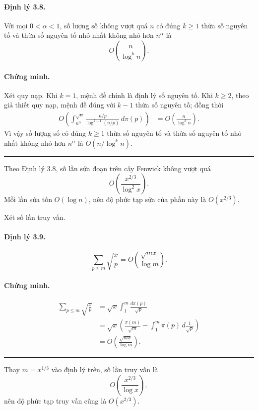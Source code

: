 \documentclass[11pt]{article}
\newcommand{\qedmark}{\hfill\rule{0.7ex}{0.7ex}}
\begin{document}
\paragraph{Định lý 3.8.}
Với mọi \(0<\alpha<1\), số lượng số không vượt quá \(n\) có đúng \(k\ge 1\)
thừa số nguyên tố và thừa số nguyên tố nhỏ nhất không nhỏ hơn \(n^\alpha\) là
\[
  O\left(\frac{n}{\log^k n}\right).
\]

\paragraph{Chứng minh.}
Xét quy nạp. Khi \(k=1\), mệnh đề chính là định lý số nguyên tố. Khi
\(k\ge 2\), theo giả thiết quy nạp, mệnh đề đúng với \(k-1\) thừa số nguyên tố;
đồng thời
\[
\begin{aligned}
O\left(\int_{n^\alpha}^{\sqrt n}
\frac{n/p}{\log^{k-1}(n/p)}\,d\pi(p)\right)
&=O\left(\frac{n}{\log^k n}\right).
\end{aligned}
\]
Vì vậy số lượng số có đúng \(k\ge 1\) thừa số nguyên tố và thừa số nguyên tố
nhỏ nhất không nhỏ hơn \(n^\alpha\) là \(O(n/\log^k n)\). \qedmark

Theo Định lý 3.8, số lần sửa đoạn trên cây Fenwick không vượt quá
\[
  O\left(\frac{x^{2/3}}{\log^2 x}\right).
\]
Mỗi lần sửa tốn \(O(\log n)\), nên độ phức tạp sửa của phần này là
\(O(x^{2/3})\).

Xét số lần truy vấn.

\paragraph{Định lý 3.9.}
\[
  \sum_{p\le m}\sqrt{\frac{x}{p}}=
  O\left(\frac{\sqrt{mx}}{\log m}\right).
\]

\paragraph{Chứng minh.}
\[
\begin{aligned}
  \sum_{p\le m}\sqrt{\frac{x}{p}}
  &=\sqrt x\int_1^m \frac{d\pi(p)}{\sqrt p}\\
  &=\sqrt x\left(\frac{\pi(m)}{\sqrt m}
  -\int_1^m \pi(p)\,d\frac1{\sqrt p}\right)\\
  &=O\left(\frac{\sqrt{mx}}{\log m}\right).
\end{aligned}
\]
\qedmark

Thay \(m=x^{1/3}\) vào định lý trên, số lần truy vấn là
\[
  O\left(\frac{x^{2/3}}{\log x}\right),
\]
nên độ phức tạp truy vấn cũng là \(O(x^{2/3})\).
\end{document}
